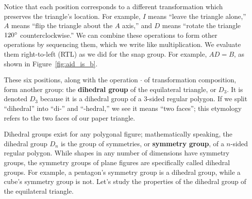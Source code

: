 \documentclass[../textbook.tex]{subfiles}
\begin{document}
Notice that each position corresponds to a different transformation which preserves the triangle's location. For example, $I$ means ``leave the triangle alone,'' $A$ means ``flip the triangle about the $A$ axis,'' and $D$ means ``rotate the triangle $120^\circ{}$ counterclockwise.'' We can combine these operations to form other operations by sequencing them, which we write like multiplication. We evaluate them right-to-left (RTL) as we did for the snap group. For example, $AD=B$, as shown in Figure~\ref{fig:aid_is_b}.

These six positions, along with the operation $\cdot$ of transformation composition, form another group: the \textbf{dihedral group} of the equilateral triangle, or $D_3$. It is denoted $D_3$ because it is a dihedral group of a $3$-sided regular polygon. If we split ``dihedral'' into ``di-'' and ``-hedral,'' we see it means ``two faces''; this etymology refers to the two faces of our paper triangle.

Dihedral groups exist for any polygonal figure; mathematically speaking, the dihedral group $D_n$ is the group of symmetries, or \textbf{symmetry group}, of a $n$-sided regular polygon. While shapes in any number of dimensions have symmetry groups, the symmetry groups of plane figures are specifically called dihedral groups. For example, a pentagon's symmetry group is a dihedral group, while a cube's symmetry group is not. Let's study the properties of the dihedral group of the equilateral triangle.


\end{document}
